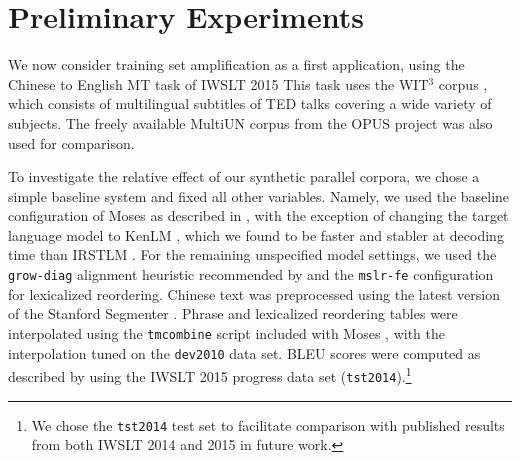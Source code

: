 





\section{Preliminary Experiments}
\label{sec:experiments}

We now consider training set amplification as a first application, using the Chinese to English MT task of IWSLT 2015 
This task uses the WIT$^3$ corpus , which consists of multilingual subtitles of TED talks covering a wide variety of subjects. 
The freely available MultiUN corpus  from the OPUS project  was also used for comparison.

To investigate the relative effect of our synthetic parallel corpora, we chose a simple baseline system and fixed all other variables.
Namely, we used the baseline configuration of Moses  as described in , with the exception of changing the target language model to KenLM , which we found to be faster and stabler at decoding time than IRSTLM .
For the remaining unspecified model settings, we used the {\small \tt grow-diag} alignment heuristic recommended by  and the {\small \tt mslr-fe} configuration for lexicalized reordering. 
Chinese text was preprocessed using the latest version of the Stanford Segmenter .
Phrase and lexicalized reordering tables were interpolated using the {\small \tt tmcombine} script included with Moses , with the interpolation tuned on the {\small \tt dev2010} data set.
BLEU scores were computed as described by  using the IWSLT 2015 progress data set ({\small \tt tst2014}).\footnote{We chose the {\small \tt tst2014} test set to facilitate comparison with published results from both IWSLT 2014 and 2015 in future work.}

